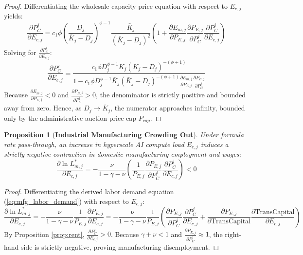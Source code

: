 \documentclass[11pt,a4paper]{article}
\newtheorem{proposition}{Proposition}
\begin{document}
\begin{proof}
Differentiating the wholesale capacity price equation with respect to $E_{c,j}$ yields:
\begin{equation*}
    \frac{\partial P_C^j}{\partial E_{c,j}} = c_1 \phi \left( \frac{D_j}{\bar{K}_j - D_j} \right)^{\phi-1} \frac{\bar{K}_j}{(\bar{K}_j - D_j)^2} \left( 1 + \frac{\partial E_{m,j}}{\partial P_{E,j}}\frac{\partial P_{E,j}}{\partial P_C^j}\frac{\partial P_C^j}{\partial E_{c,j}} \right)
\end{equation*}
Solving for $\frac{\partial P_C^j}{\partial E_{c,j}}$:
\begin{equation*}
    \frac{\partial P_C^j}{\partial E_{c,j}} = \frac{c_1 \phi D_j^{\phi-1} \bar{K}_j (\bar{K}_j - D_j)^{-(\phi+1)}}{1 - c_1 \phi D_j^{\phi-1} \bar{K}_j (\bar{K}_j - D_j)^{-(\phi+1)} \frac{\partial E_{m,j}}{\partial P_{E,j}}\frac{\partial P_{E,j}}{\partial P_C^j}}
\end{equation*}
Because $\frac{\partial E_{m,j}}{\partial P_{E,j}} < 0$ and $\frac{\partial P_{E,j}}{\partial P_C^j} > 0$, the denominator is strictly positive and bounded away from zero. Hence, as $D_j \to \bar{K}_j$, the numerator approaches infinity, bounded only by the administrative auction price cap $P_{cap}$.
\end{proof}

\begin{proposition}[\textbf{Industrial Manufacturing Crowding Out}]\label{prop:crowdout}
Under formula rate pass-through, an increase in hyperscale AI compute load $E_{c,j}$ induces a strictly negative contraction in domestic manufacturing employment and wages:
\begin{equation}\label{eq:prop2_crowdout}
    \frac{\partial \ln L_{m,j}^*}{\partial E_{c,j}} = -\frac{\nu}{1-\gamma-\nu} \left( \frac{1}{P_{E,j}} \frac{\partial P_{E,j}}{\partial P_C^j} \frac{\partial P_C^j}{\partial E_{c,j}} \right) < 0
\end{equation}
\end{proposition}

\begin{proof}
Differentiating the derived labor demand equation (\ref{eq:mfg_labor_demand}) with respect to $E_{c,j}$:
\begin{equation*}
    \frac{\partial \ln L_{m,j}^*}{\partial E_{c,j}} = -\frac{\nu}{1-\gamma-\nu} \frac{1}{P_{E,j}} \frac{\partial P_{E,j}}{\partial E_{c,j}} = -\frac{\nu}{1-\gamma-\nu} \frac{1}{P_{E,j}} \left( \frac{\partial P_{E,j}}{\partial P_C^j} \frac{\partial P_C^j}{\partial E_{c,j}} + \frac{\partial P_{E,j}}{\partial \text{TransCapital}} \frac{\partial \text{TransCapital}}{\partial E_{c,j}} \right)
\end{equation*}
By Proposition \ref{prop:rent}, $\frac{\partial P_C^j}{\partial E_{c,j}} > 0$. Because $\gamma + \nu < 1$ and $\frac{\partial P_{E,j}}{\partial P_C^j} \approx 1$, the right-hand side is strictly negative, proving manufacturing disemployment.
\end{proof}
\end{document}
